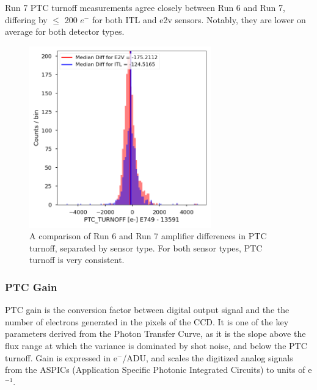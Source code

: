 Run 7 PTC turnoff measurements agree closely between Run 6 and Run 7, differing by $\leq$ 200 $e^-$ for both ITL and e2v sensors. Notably, they are lower on average for both detector types.

\begin{figure}[ht]
\begin{centering}
\includegraphics[width=0.7\textwidth]{figures/baselineCharacterization/PTC_TURNOFF_13591_E749_diff.png}
\caption{A comparison of Run 6 and Run 7 amplifier differences in PTC turnoff, separated by sensor type. For both sensor types, PTC turnoff is very consistent.}
\end{centering}
\end{figure}

\subsubsection{PTC Gain}\label{ptc-gain}

PTC gain is the conversion factor between digital output signal and the the number of electrons generated in the pixels of the CCD. It is one of the key parameters derived from the Photon Transfer
Curve, as it is the slope above the flux range at which the variance is dominated by shot noise, and below the PTC turnoff. Gain is expressed in e$^-$/ADU, and scales the digitized analog signals from the ASPICs (Application Specific Photonic Integrated Circuits) to units of e$^{-1}$.

